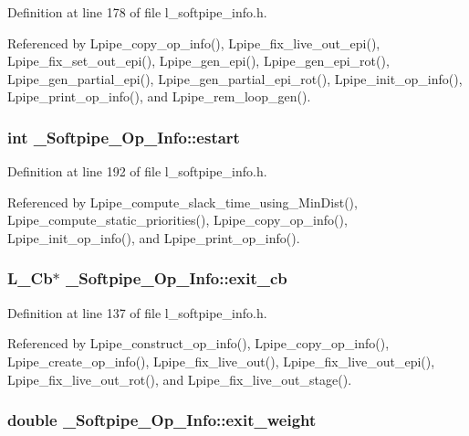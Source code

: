 Definition at line 178 of file l\_\-softpipe\_\-info.h.

Referenced by Lpipe\_\-copy\_\-op\_\-info(), Lpipe\_\-fix\_\-live\_\-out\_\-epi(), Lpipe\_\-fix\_\-set\_\-out\_\-epi(), Lpipe\_\-gen\_\-epi(), Lpipe\_\-gen\_\-epi\_\-rot(), Lpipe\_\-gen\_\-partial\_\-epi(), Lpipe\_\-gen\_\-partial\_\-epi\_\-rot(), Lpipe\_\-init\_\-op\_\-info(), Lpipe\_\-print\_\-op\_\-info(), and Lpipe\_\-rem\_\-loop\_\-gen().
\subsubsection{\setlength{\rightskip}{0pt plus 5cm}int \bf{\_\-Softpipe\_\-Op\_\-Info::estart}}\label{struct__Softpipe__Op__Info_dcc3a8736b3d1269334af5fe728c232a}




Definition at line 192 of file l\_\-softpipe\_\-info.h.

Referenced by Lpipe\_\-compute\_\-slack\_\-time\_\-using\_\-Min\-Dist(), Lpipe\_\-compute\_\-static\_\-priorities(), Lpipe\_\-copy\_\-op\_\-info(), Lpipe\_\-init\_\-op\_\-info(), and Lpipe\_\-print\_\-op\_\-info().
\subsubsection{\setlength{\rightskip}{0pt plus 5cm}L\_\-Cb$\ast$ \bf{\_\-Softpipe\_\-Op\_\-Info::exit\_\-cb}}\label{struct__Softpipe__Op__Info_bcf3d5ebc41068339a81cec12717b661}




Definition at line 137 of file l\_\-softpipe\_\-info.h.

Referenced by Lpipe\_\-construct\_\-op\_\-info(), Lpipe\_\-copy\_\-op\_\-info(), Lpipe\_\-create\_\-op\_\-info(), Lpipe\_\-fix\_\-live\_\-out(), Lpipe\_\-fix\_\-live\_\-out\_\-epi(), Lpipe\_\-fix\_\-live\_\-out\_\-rot(), and Lpipe\_\-fix\_\-live\_\-out\_\-stage().
\subsubsection{\setlength{\rightskip}{0pt plus 5cm}double \bf{\_\-Softpipe\_\-Op\_\-Info::exit\_\-weight}}\label{struct__Softpipe__Op__Info_f25a421770f3010008e84f8f0b491302}




